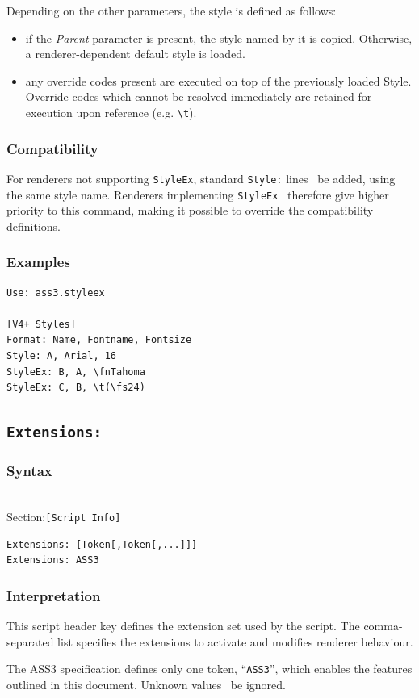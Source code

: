 \documentclass{spec}
\newcommand{\syntax}[1]{
	\subsubsection*{Syntax}
	\begin{tabbing}
	\hspace{2cm}\=\\[-16pt]
	#1
	\end{tabbing}
}
\newcommand{\secspec}[1]{Section:\>\texttt{#1}}
\begin{document}
Depending on the other parameters, the style is defined as follows:
\begin{itemize}
\item if the \emph{Parent} parameter is present, the style named by it is
copied. Otherwise, a renderer-dependent default style is loaded.
\item any override codes present are executed on top of the previously
loaded Style. Override codes which cannot be resolved immediately are
retained for execution upon reference (e.g. \verb!\t!).
\end{itemize}

\subsubsection*{Compatibility}
For renderers not supporting \verb!StyleEx!, standard \verb!Style:! lines
\should\ be added, using the same style name. Renderers implementing
\verb!StyleEx! \must\ therefore give higher priority to this command,
making it possible to override the compatibility definitions.

\subsubsection*{Examples}
\begin{verbatim}
Use: ass3.styleex

[V4+ Styles]
Format: Name, Fontname, Fontsize
Style: A, Arial, 16
StyleEx: B, A, \fnTahoma
StyleEx: C, B, \t(\fs24)
\end{verbatim}

\newpage
\subsection{\texttt{Extensions:}}
\label{Extensions}
\syntax{\secspec{[Script Info]}}

\begin{verbatim}
Extensions: [Token[,Token[,...]]]
Extensions: ASS3
\end{verbatim}

\subsubsection*{Interpretation}
This script header key defines the extension set used by the script.
The comma-separated list specifies the extensions to activate and
modifies renderer behaviour.

The ASS3 specification defines only one token, ``\texttt{ASS3}'',
which enables the features outlined in this document. Unknown values
\must\ be ignored.
\end{document}
